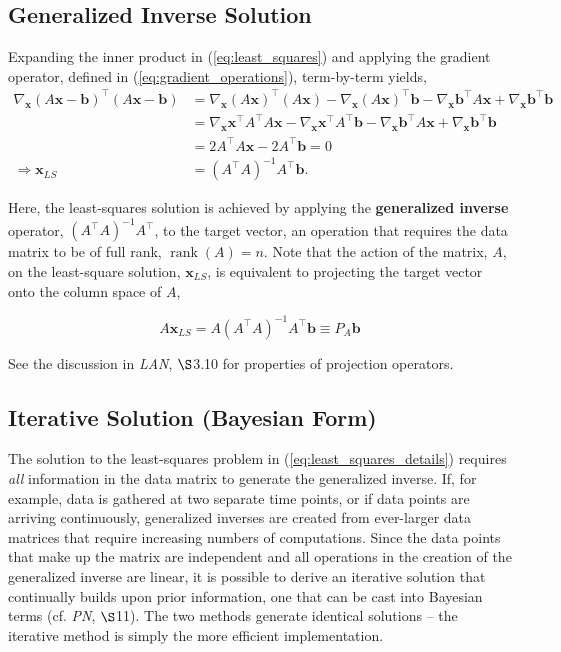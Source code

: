 \documentclass[12pt, twoside, draft]{article}
\begin{document}
\subsection{Generalized Inverse Solution}
Expanding the inner product in (\ref{eq:least_squares}) and applying the gradient operator, defined in (\ref{eq:gradient_operations}), term-by-term yields,
\begin{align}\label{eq:least_squares_details}
\nabla_\mathbf{x} \left( A \mathbf{x} - \mathbf{b} \right)^\top \left( A \mathbf{x} - \mathbf{b} \right) & =
\nabla_\mathbf{x} \left( A \mathbf{x} \right)^\top \left( A \mathbf{x} \right) - \nabla_\mathbf{x} \left( A \mathbf{x} \right)^\top \mathbf{b} - \nabla_\mathbf{x} \mathbf{b}^\top A \mathbf{x} + \nabla_\mathbf{x} \mathbf{b}^\top \mathbf{b} \\
& = \nabla_\mathbf{x} \mathbf{x}^\top A^\top A \mathbf{x} - \nabla_\mathbf{x} \mathbf{x}^\top A^\top \mathbf{b} - \nabla_\mathbf{x} \mathbf{b}^\top A \mathbf{x} + \nabla_\mathbf{x} \mathbf{b}^\top \mathbf{b} \\
& = 2 A^\top A \mathbf{x} - 2 A^\top \mathbf{b} = 0 \\
\Rightarrow \mathbf{x}_{LS} &= \left( A^\top A \right)^{-1} A^\top \mathbf{b}.
\end{align}

Here, the least-squares solution is achieved by applying the \textbf{generalized inverse} operator, $\left( A^\top A \right)^{-1} A^\top$, to the target vector, an operation that requires the data matrix to be of full rank, $\operatorname{rank} (A) = n$.  Note that the action of the matrix, $A$, on the least-square solution, $\mathbf{x}_{LS}$, is equivalent to projecting the target vector onto the column space of $A$,

\begin{equation}\label{eq:least_squares_projection}
A \mathbf{x}_{LS} = A \left( A^\top A \right)^{-1} A^\top \mathbf{b} \equiv P_A \mathbf{b}
\end{equation}

See the discussion in \textit{LAN}, $\S$3.10 for properties of projection operators.

\subsection{Iterative Solution (Bayesian Form)}
The solution to the least-squares problem in (\ref{eq:least_squares_details}) requires \textit{all} information in the data matrix to generate the generalized inverse.  If, for example, data is gathered at two separate time points, or if data points are arriving continuously, generalized inverses are created from ever-larger data matrices that require increasing numbers of computations.  Since the data points that make up the matrix are independent and all operations in the creation of the generalized inverse are linear, it is possible to derive an iterative solution that continually builds upon prior information, one that can be cast into Bayesian terms (cf. \textit{PN}, $\S$11).  The two methods generate identical solutions -- the iterative method is simply the more efficient implementation.
\end{document}
